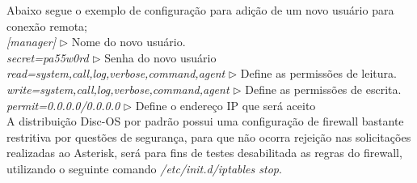 Abaixo segue o exemplo de configuração para adição de um novo usuário para conexão remota;
\\
\hspace{10 mm}\textit{[manager]} 	\hspace{10 mm} $\triangleright$ Nome do novo usuário.\\
\hspace{10 mm}\textit{secret=pa55w0rd} \hspace{10 mm} $\triangleright$ Senha do novo usuário \\
\hspace{10 mm}\textit{read=system,call,log,verbose,command,agent}  \hspace{10 mm} $\triangleright$ Define as permissões de leitura.\\
\hspace{10 mm}\textit{write=system,call,log,verbose,command,agent}  \hspace{10 mm} $\triangleright$ Define as permissões de escrita.\\
\hspace{10 mm}\textit{permit=0.0.0.0/0.0.0.0} \hspace{10 mm} $\triangleright$ Define o endereço IP que será aceito \\


A distribuição Disc-OS por padrão possui uma configuração de firewall bastante restritiva por questões de segurança, para que não ocorra rejeição nas solicitações realizadas ao Asterisk, será para fins de testes desabilitada as regras do firewall, utilizando o seguinte comando \textit{/etc/init.d/iptables stop}.
 
 


